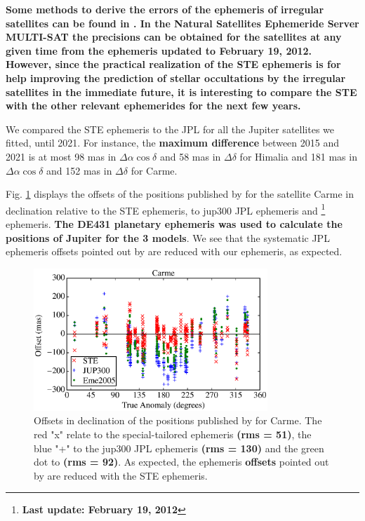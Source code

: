 \documentclass[useAMS,usenatbib]{mn2e}
\begin{document}
\textbf{Some methods to derive the errors of the ephemeris of irregular satellites can be found in \cite{Emelyanov2010}. In the Natural Satellites Ephemeride Server MULTI-SAT \citep{Emelyanov2008} the precisions can be obtained for the satellites at any given time from the \cite{Emelyanov2005} ephemeris updated to February 19, 2012. However, since the practical realization of the STE ephemeris is for help improving the prediction of stellar occultations by the irregular satellites in the immediate future, it is interesting to compare the STE with the other relevant ephemerides for the next few years.}

We compared the STE ephemeris to the JPL for all the Jupiter satellites we fitted, until 2021. For instance, the \textbf{maximum difference} between 2015 and 2021 is at most 98 mas in $\Delta \alpha \cos \delta$ and 58 mas in $\Delta \delta$ for Himalia and 181 mas in $\Delta \alpha \cos \delta$ and 152 mas in $\Delta \delta$ for Carme.

Fig. \ref{Fig: JPL-STE} displays the offsets of the positions published by  for the satellite Carme in declination relative to the STE ephemeris, to \cite{Jacobson2012} jup300 JPL ephemeris and \cite{Emelyanov2005}\footnote{\textbf{Last update: February 19, 2012}} ephemeris. \textbf{The DE431 planetary ephemeris \citep{Folkner2014} was used to calculate the positions of Jupiter for the 3 models}. We see that the systematic JPL ephemeris offsets pointed out by  are reduced with our ephemeris, as expected.

\begin{figure}
\includegraphics[width=8.8cm]{figures/Carme_ephemeris.eps}
\caption{Offsets in declination of the positions published by \protect{} for Carme. The red "x" relate to the special-tailored ephemeris \textbf{(rms = 51)}, the blue "+" to the jup300 JPL ephemeris \textbf{(rms = 130)} and the green dot to \protect\cite{Emelyanov2005} \textbf{(rms = 92)}. As expected, the ephemeris \textbf{offsets} pointed out by \protect{} are reduced with the STE ephemeris. \label{Fig: JPL-STE}}
\end{figure}
\end{document}
